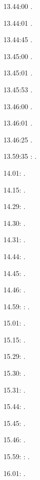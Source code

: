 \label{key}\documentclass[italian]{article}
\begin{document}
13.44:00     .

13.44:01     .

13.44:45     .

13.45:00     .

13.45:01     .

13.45:53     .

13.46:00     .

13.46:01     .

13.46:25     .

13.59:35     
:    .

14.01:     . 

14.15:     . 

14.29:     . 

14.30:     .

14.31:     .

14.44:     .

14.45:     .

14.46:     .

14.59:     
:    .

15.01:     . 

15.15:     . 

15.29:     . 

15.30:     .

15.31:     .

15.44:     .

15.45:     .

15.46:     .

15.59:     
:    .

16.01:     . 
\end{document}
